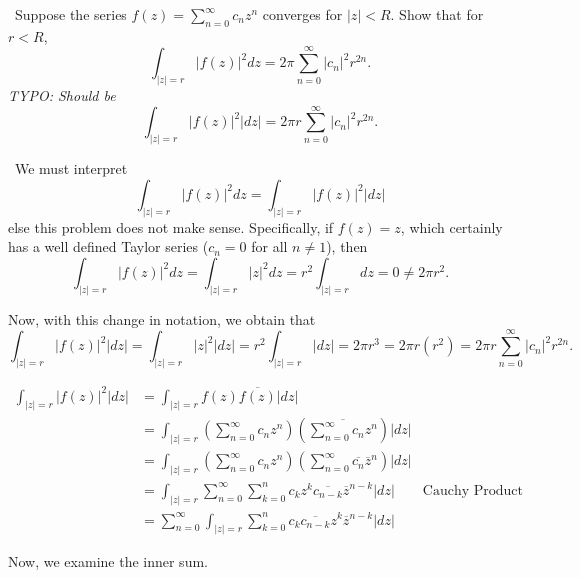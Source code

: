 \documentclass[12pt]{Homework}
\begin{document}
\begin{problem} $\,$
Suppose the series $f(z)=\sum_{n=0}^\infty c_nz^n$ converges for $|z|<R$. Show that for $r<R$, $$\int_{|z|=r}|f(z)|^2dz=2\pi\sum_{n=0}^\infty|c_n|^2r^{2n}.$$ \textit{TYPO: Should be} $$\int_{|z|=r}|f(z)|^2|dz|=2\pi r\sum_{n=0}^\infty|c_n|^2r^{2n}.$$ 
\end{problem}


\begin{solution}$\,$
We must interpret $$\int_{|z|=r}|f(z)|^2dz=\int_{|z|=r}|f(z)|^2|dz|$$ else this problem does not make sense. Specifically, if $f(z)=z$, which certainly has a well defined Taylor series ($c_n=0$ for all $n\not=1$), then $$\int_{|z|=r}|f(z)|^2dz=\int_{|z|=r}|z|^2dz=r^2\int_{|z|=r}dz=0\not=2\pi r^2.$$

Now, with this change in notation, we obtain that $$\int_{|z|=r}|f(z)|^2|dz|=\int_{|z|=r}|z|^2|dz|=r^2\int_{|z|=r}|dz|=2\pi r^3=2\pi r( r^2)=2\pi r\sum_{n=0}^\infty|c_n|^2r^{2n}.$$

\begin{align*}
    \int_{|z|=r}|f(z)|^2|dz|&=\int_{|z|=r}f(z)\overline{f(z)}|dz|\\
    &=\int_{|z|=r}\left(\sum_{n=0}^\infty c_nz^n\right)\left(\overline{\sum_{n=0}^\infty c_nz^n}\right)|dz|\\
    &=\int_{|z|=r}\left(\sum_{n=0}^\infty c_nz^n\right)\left(\sum_{n=0}^\infty \overline{c_n}\overline{z}^n\right)|dz|\\
    &=\int_{|z|=r}\sum_{n=0}^\infty\sum_{k=0}^nc_kz^k\overline{c_{n-k}}\overline{z}^{n-k}|dz|\qquad\text{Cauchy Product}\\
    &=\sum_{n=0}^\infty\int_{|z|=r}\sum_{k=0}^nc_k\overline{c_{n-k}}z^k\overline{z}^{n-k}|dz|
    \end{align*}
    
Now, we examine the inner sum. 

\begin{comment}
At this point, it is exceptionally helpful to illustrate this problem with two examples.

\boxed{n=3} Then, forgetting the $c_k,\overline{c_{n-k}}$ for a moment, we can look at $$\sum_{k=0}^3z^k\overline{z}^{3-k}=\overline{z}^3+z\overline{z}^2+z^2\overline{z}+z^3=\frac{z^3\overline{z}^3}{z^3}+\frac{z^2\overline{z}^2}{z}+z\cdot z\overline{z}+z^3=\frac{|z^3|^2}{z^3}+\frac{|z^2|^2}{z}+z|z|^2+z^3.$$

Note that if we integrate over the circle $|z|=r,$ then using the substitution $z=re^{i\theta}$ and $dz=rie^{i\theta}d\theta$ so $|dz|=rd\theta$, we will get that each of these functions dies. For example, $$\int_{|z|=r}\frac{|z|^6}{z^3}|dz|=r^7\int_0^{2\pi}\frac{1}{r^3e^{3i\theta}}d\theta=\int_0^{2\pi}\frac{i}{r^2e^{2i\theta}}d\theta=\frac{i}{-2ir^2}e^{-2i\theta}\big|_0^{2\pi}=0.$$ Since each integral will contain 


\end{comment}
\end{solution}
\end{document}

